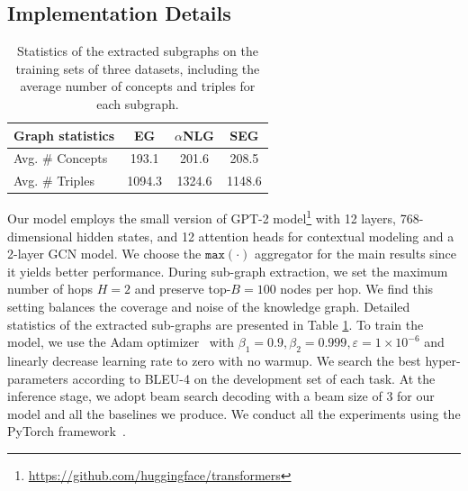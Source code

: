 \documentclass[11pt,a4paper]{article}
\begin{document}
\subsection{Implementation Details}

\begin{table}[h]
    \centering
    \small
    \begin{tabular}{l ccc}
        \toprule[1.5pt]
        Graph statistics & EG & $\alpha$NLG & SEG
         \\
        \midrule[1pt]
        Avg. \# Concepts & 193.1 & 201.6 & 208.5 \\
        Avg. \# Triples & 1094.3 & 1324.6 & 1148.6 \\
        \bottomrule[1.5pt]
    \end{tabular}
    \caption{Statistics of the extracted subgraphs on the training sets of three datasets, including %
    the average number of concepts and triples for each subgraph.}
    \label{tab:subgraph-stats}
\end{table}

Our model employs the small version of GPT-2 model\footnote{\url{https://github.com/huggingface/transformers}}
with 12 layers, 768-dimensional hidden states, and 12 attention heads 
for contextual modeling and a 2-layer GCN model. We choose the $\texttt{max}(\cdot)$ aggregator for the main results since it yields better performance. During sub-graph extraction, we set the maximum number of hops $H=2$ and preserve top-$B=100$ nodes per hop. We find this setting balances the coverage and noise of the knowledge graph. Detailed statistics of the extracted sub-graphs are presented in Table \ref{tab:subgraph-stats}. To train the model, we use the Adam optimizer~\citep{kingma2014adam} with $\beta_1=0.9, \beta_2=0.999, \varepsilon=1\times10^{-6}$ and linearly decrease learning rate to zero with no warmup.
We search the best hyper-parameters according to BLEU-4 on the development set of each task. At the inference stage, we adopt beam search decoding with a beam size of 3 for our model and all the baselines we produce. We conduct all the experiments using the PyTorch framework~\citep{paszke2017automatic}.
\end{document}
